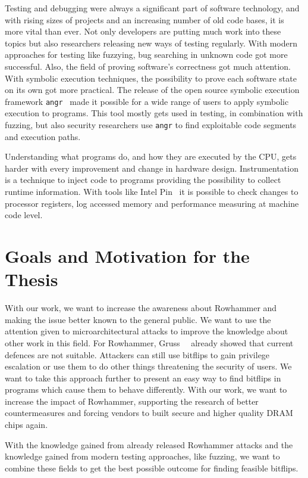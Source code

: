 Testing and debugging were always a significant part of software technology, and
with rising sizes of projects and an increasing number of old code bases, it is
more vital than ever. Not only developers are putting much work into these
topics but also researchers releasing new ways of testing regularly. With modern
approaches for testing like fuzzying, bug searching in unknown code got more
successful. Also, the field of proving software's correctness got much
attention. With symbolic execution techniques, the possibility to prove each
software state on its own got more practical. The release of the open source
symbolic execution framework \texttt{angr}~\cite{angrpaper} made it possible for
a wide range of users to apply symbolic execution to programs. This tool mostly
gets used in testing, in combination with fuzzing, but also security researchers
use \texttt{angr} to find exploitable code segments and execution paths.

Understanding what programs do, and how they are executed by the CPU, gets
harder with every improvement and change in hardware design. Instrumentation is
a technique to inject code to programs providing the possibility to collect
runtime information. With tools like Intel Pin~\cite{pintool} it is possible to
check changes to processor registers, log accessed memory and performance
measuring at machine code level.

\section{Goals and Motivation for the Thesis}

With our work, we want to increase the awareness about Rowhammer and making the
issue better known to the general public. We want to use the attention given to
microarchitectural attacks to improve the knowledge about other work in this
field. For Rowhammer, Gruss~\etal~\cite{flipinthewall} already showed that
current defences are not suitable. Attackers can still use bitflips to gain
privilege escalation or use them to do other things threatening the security of
users. We want to take this approach further to present an easy way to find
bitflips in programs which cause them to behave differently. With our work, we
want to increase the impact of Rowhammer, supporting the research of better
countermeasures and forcing vendors to built secure and higher quality DRAM
chips again.

With the knowledge gained from already released Rowhammer attacks and the
knowledge gained from modern testing approaches, like fuzzing, we want to
combine these fields to get the best possible outcome for finding feasible
bitflips.

